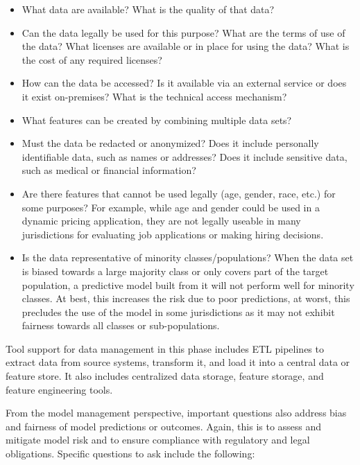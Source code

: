 \begin{itemize}
   \item What data are available? What is the quality of that data?
   \item Can the data legally be used for this purpose? What are the terms of use of the data? What licenses are available or in place for using the data? What is the cost of any required licenses?
   \item How can the data be accessed? Is it available via an external service or does it exist on-premises? What is the technical access mechanism?
   \item What features can be created by combining multiple data sets?
   \item Must the data be redacted or anonymized? Does it include personally identifiable data, such as names or addresses? Does it include sensitive data, such as medical or financial information?
   \item Are there features that cannot be used legally (age, gender, race, etc.) for some purposes? For example, while age and gender could be used in a dynamic pricing application, they are not legally useable in many jurisdictions for evaluating job applications or making hiring decisions. 
   \item Is the data representative of minority classes/populations? When the data set is biased towards a large majority class or only covers part of the target population, a predictive model built from it will not perform well for minority classes. At best, this increases the risk due to poor predictions, at worst, this precludes the use of the model in some jurisdictions as it may not exhibit fairness towards all classes or sub-populations.
\end{itemize}

Tool support for data management in this phase includes ETL pipelines to extract data from source systems, transform it, and load it into a central data or feature store. It also includes centralized data storage, feature storage, and feature engineering tools. 

From the model management perspective, important questions also address bias and fairness of model predictions or outcomes. Again, this is to assess and mitigate model risk and to ensure compliance with regulatory and legal obligations. Specific questions to ask include the following:

